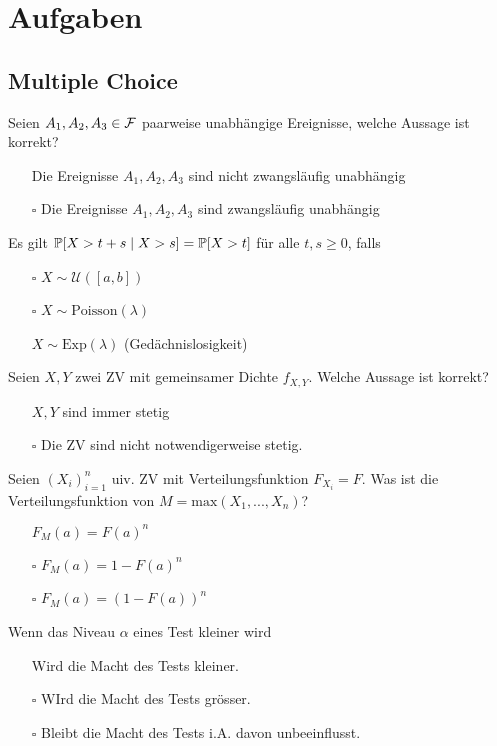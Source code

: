 \section*{Aufgaben}


\subsection*{Multiple Choice}

Seien $A_1, A_2, A_3 \in \mathcal{F}$ paarweise unabhängige Ereignisse, welche Aussage ist korrekt?
\begin{itemize}
	\item[\marked] Die Ereignisse $A_1, A_2, A_3$ sind nicht zwangsläufig unabhängig
	\item[$\square$] Die Ereignisse $A_1, A_2, A_3$ sind zwangsläufig unabhängig
\end{itemize}

\hrulefill

Es gilt $\mathbb{P}[X > t + s \; | \; X > s] = \mathbb{P}[X > t]$ für alle $t,s \geq 0$, falls
\begin{itemize}
	\item[$\square$] $X \sim \mathcal{U}([a,b])$
	\item[$\square$] $X \sim \text{Poisson}(\lambda)$
	\item[\marked] $X \sim \text{Exp}(\lambda)$ (Gedächnislosigkeit)
\end{itemize}

\hrulefill

Seien $X,Y$ zwei ZV mit gemeinsamer Dichte $f_{X,Y}$. Welche Aussage ist korrekt?
\begin{itemize}
	\item[\marked] $X,Y$ sind immer stetig
	\item[$\square$] Die ZV sind nicht notwendigerweise stetig.
\end{itemize}

\hrulefill

Seien $(X_i)_{i = 1}^n$ uiv. ZV mit Verteilungsfunktion $F_{X_i} = F$. Was ist die Verteilungsfunktion von $M = \text{max}(X_1,...,X_n)$?
\begin{itemize}
	\item[\marked] $F_M(a) = F(a)^n$
	\item[$\square$] $F_M(a) = 1 - F(a)^n$
	\item[$\square$] $F_M(a) = (1 - F(a))^n$
\end{itemize}

\hrulefill

Wenn das Niveau $\alpha$ eines Test kleiner wird
\begin{itemize}
	\item[\marked] Wird die Macht des Tests kleiner.
	\item[$\square$] WIrd die Macht des Tests grösser.
	\item[$\square$] Bleibt die Macht des Tests i.A. davon unbeeinflusst.
\end{itemize}

